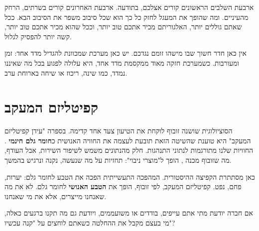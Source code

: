 ארבעת השלבים הראשונים קורים אצלכם, בתודעה. ארבעת האחרונים קורים בשרתים, הרחק מהעיניים. ומה שהופך את המעגל לחזק כל כך הוא שכל סיבוב משפר את הסיבוב הבא. ככל שאתם גוללים יותר, האלגוריתם מכיר אתכם טוב יותר, וככל שהוא מכיר אתכם טוב יותר, קשה יותר להפסיק לגלול.

\begin{alertbox}
אין כאן חדר חשוך שבו מישהו זומם נגדכם. יש כאן מערכת שמכוונת להגדיל מדד אחד: זמן ומעורבות. כשמערכת חזקה מאוד ממקסמת מדד אחד, היא עלולה לפגוע בכל מה שאיננו נמדד, כמו שינה, ריכוז או שיחה בארוחת ערב.
\end{alertbox}

\section{קפיטליזם המעקב}

הסוציולוגית שושנה זובוף לוקחת את הטיעון צעד אחד קדימה. בספרה "עידן קפיטליזם המעקב" היא טוענת שהשיטה הזאת תובעת לעצמה את החוויה האנושית כ\textbf{חומר גלם חינמי} \parencite{zuboff2019}. החוויות שלנו מתורגמות לנתוני התנהגות. חלק מהנתונים משמש לשיפור השירות, אבל העודף, מה שזובוף מכנה , הופך ל"מוצרי ניבוי": תחזיות על מה שנעשה, נקנה ונרגיש בהמשך.

כאן מסתתרת הקפיצה ההיסטורית. המהפכה התעשייתית הפכה את הטבע לחומר גלם: יערות, פחם, נפט. קפיטליזם המעקב, לפי זובוף, הופך את \textbf{הטבע האנושי} לחומר גלם. לא את מה שאנחנו מייצרים, אלא את מי שאנחנו.

\begin{thinkbox}
אם חברה יודעת מתי אתם עייפים, בודדים או משועממים, ויודעת גם מה תקנו ברגעים כאלה, מי בעצם מקבל את ההחלטה כשאתם לוחצים על "קנה עכשיו"?
\end{thinkbox}
